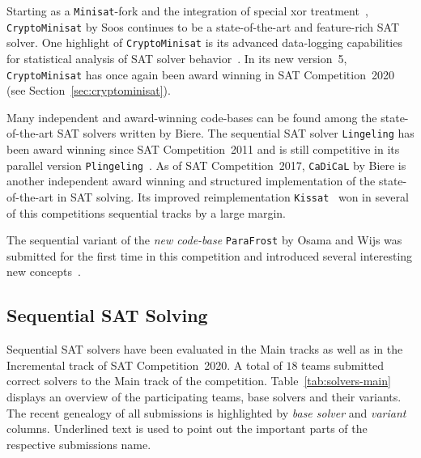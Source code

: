 \documentclass{elsarticle}
\newcommand{\solver}[1]{\texttt{#1}}
\begin{document}
Starting as a \solver{Minisat}-fork and the integration of special xor treatment~\cite{Soos:2009:Crypto}, \solver{CryptoMinisat} by Soos continues to be a state-of-the-art and feature-rich SAT solver. 
One highlight of \solver{CryptoMinisat} is its advanced data-logging capabilities for statistical analysis of SAT solver behavior~\cite{Soos:2019:ChrystalBall}. 
In its new version~5, \solver{CryptoMinisat} has once again been award winning in SAT Competition~2020 (see Section~\ref{sec:cryptominisat}). 

Many independent and award-winning code-bases can be found among the state-of-the-art SAT solvers written by Biere. 
The sequential SAT solver \solver{Lingeling} has been award winning since SAT Competition~2011 and is still competitive in its parallel version \solver{Plingeling}~\cite{Biere:2012:Lingeling}. 
As of SAT Competition~2017, \solver{CaDiCaL} %
by Biere is another independent award winning and structured implementation of the state-of-the-art in SAT solving. 
Its improved reimplementation \solver{Kissat}~\cite{Biere:SC2020} won in several of this competitions sequential tracks by a large margin. 

The sequential variant of the \emph{new code-base} \solver{ParaFrost} by Osama and Wijs was submitted for the first time in this competition and introduced several interesting new concepts~\cite{Osama:SC2020:Parafrost}. 


\subsection{Sequential SAT Solving}
\label{sec:part:seq}

Sequential SAT solvers have been evaluated in the Main tracks as well as in the Incremental track of SAT Competition~2020. 
A total of $18$ teams submitted correct solvers to the Main track of the competition. 
Table~\ref{tab:solvers-main} displays an overview of the participating teams, base solvers and their variants. 
The recent genealogy of all submissions is highlighted by \emph{base solver} and \emph{variant} columns. 
Underlined text is used to point out the important parts of the respective submissions name.

\renewcommand{\solver}[1]{\underline{\texttt{#1}}}
\newcommand{\solbert}[1]{\texttt{#1}}
\end{document}
